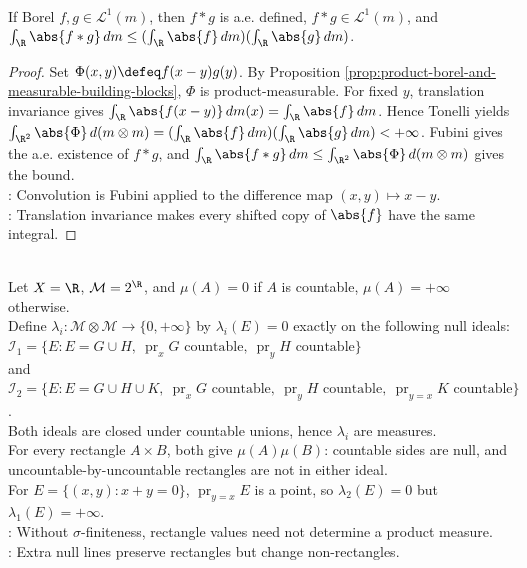 \begin{proposition} \label{prop:l1-convolution-basic-bound} \\
If Borel $f,g\in\mathscr{L}^1(m)$, then $f*g$ is a.e. defined, $f*g\in\mathscr{L}^1(m)$, and $\int_\R\abs{f*g}\,dm\leq(\int_\R\abs{f}\,dm)(\int_\R\abs{g}\,dm)$.
\begin{proof}
Set $\Phi(x,y)\defeq f(x-y)g(y)$. By Proposition \ref{prop:product-borel-and-measurable-building-blocks}, $\Phi$ is product-measurable. For fixed $y$, translation invariance gives $\int_\R\abs{f(x-y)}\,dm(x)=\int_\R\abs{f}\,dm$. Hence Tonelli yields $\int_{\R^2}\abs{\Phi}\,d(m\otimes m)=(\int_\R\abs{f}\,dm)(\int_\R\abs{g}\,dm)<+\infty$. Fubini gives the a.e. existence of $f*g$, and $\int_\R\abs{f*g}\,dm\leq\int_{\R^2}\abs{\Phi}\,d(m\otimes m)$ gives the bound.\\
: Convolution is Fubini applied to the difference map $(x,y)\mapsto x-y$.\\
: Translation invariance makes every shifted copy of $\abs{f}$ have the same integral.
\end{proof}
\end{proposition}

\begin{example} \label{ex:nonunique-products-without-sigma-finiteness} \\
Let $X=\R$, $\mathcal{M}=2^\R$, and $\mu(A)=0$ if $A$ is countable, $\mu(A)=+\infty$ otherwise.\\
Define $\lambda_i:\mathcal{M}\otimes\mathcal{M}\to\{0,+\infty\}$ by $\lambda_i(E)=0$ exactly on the following null ideals:\\
$\mathcal{I}_1=\{E:E=G\cup H,\ \operatorname{pr}_xG\text{ countable},\ \operatorname{pr}_yH\text{ countable}\}$\\
and $\mathcal{I}_2=\{E:E=G\cup H\cup K,\ \operatorname{pr}_xG\text{ countable},\ \operatorname{pr}_yH\text{ countable},\ \operatorname{pr}_{y=x}K\text{ countable}\}$.\\
Both ideals are closed under countable unions, hence $\lambda_i$ are measures.\\
For every rectangle $A\times B$, both give $\mu(A)\mu(B)$: countable sides are null, and uncountable-by-uncountable rectangles are not in either ideal.\\
For $E=\{(x,y):x+y=0\}$, $\operatorname{pr}_{y=x}E$ is a point, so $\lambda_2(E)=0$ but $\lambda_1(E)=+\infty$.\\
: Without $\sigma$-finiteness, rectangle values need not determine a product measure.\\
: Extra null lines preserve rectangles but change non-rectangles.
\end{example}

